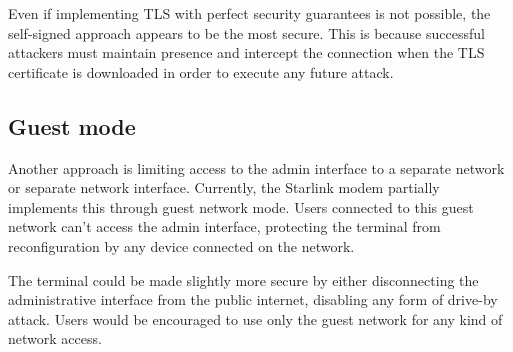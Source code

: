 Even if implementing TLS with perfect security guarantees is not possible, the self-signed approach appears to be the most secure.
This is because successful attackers must maintain presence and intercept the connection when the TLS certificate is downloaded in order to execute any future attack.

\subsection{Guest mode}

Another approach is limiting access to the admin interface to a separate network or separate network interface.
Currently, the Starlink modem partially implements this through guest network mode.
Users connected to this guest network can't access the admin interface, protecting the terminal from reconfiguration by any device connected on the network.

The terminal could be made slightly more secure by either disconnecting the administrative interface from the public internet, disabling any form of drive-by attack.
Users would be encouraged to use only the guest network for any kind of network access.

